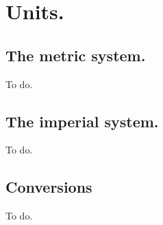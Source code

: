 \chapter{Units.}\label{Units}

\section{The metric system.}
To do.

\section{The imperial system.}
To do.

\section {Conversions}
To do.
